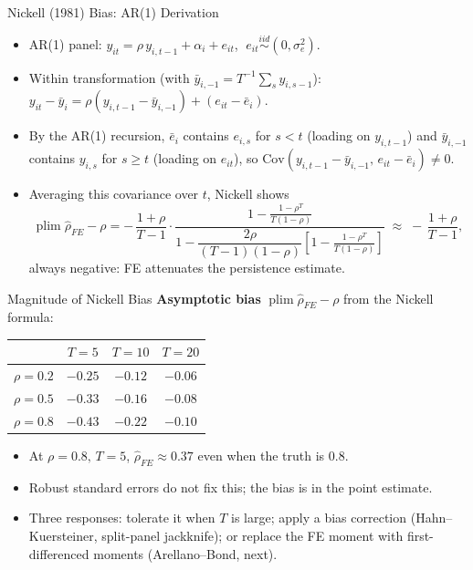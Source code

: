\documentclass[aspectratio=169, handout, t]{beamer}
\numberwithin{equation}{section}
\begin{document}
\begin{frame}{Nickell (1981) Bias: AR(1) Derivation}
\begin{itemize}
\item AR(1) panel: $y_{it}=\rho\,y_{i,t-1}+\alpha_i+e_{it}$, $\;e_{it}\stackrel{iid}{\sim}(0,\sigma_e^2)$.
\item Within transformation (with $\bar{y}_{i,-1}=T^{-1}\!\sum_s y_{i,s-1}$):
$y_{it}-\bar{y}_i = \rho(y_{i,t-1}-\bar{y}_{i,-1}) + (e_{it}-\bar{e}_i)$.\pause
\item By the AR(1) recursion, $\bar{e}_i$ contains $e_{i,s}$ for $s<t$ (loading on $y_{i,t-1}$) and $\bar{y}_{i,-1}$ contains $y_{i,s}$ for $s\geq t$ (loading on $e_{it}$), so $\text{Cov}(y_{i,t-1}-\bar{y}_{i,-1},\,e_{it}-\bar{e}_i)\neq 0$.\pause
\item Averaging this covariance over $t$, Nickell shows
\[
\operatorname{plim}\hat{\rho}_{FE}-\rho
=
-\,\frac{1+\rho}{T-1}\cdot
\frac{1-\frac{1-\rho^T}{T(1-\rho)}}{1-\dfrac{2\rho}{(T-1)(1-\rho)}\!\left[1-\frac{1-\rho^T}{T(1-\rho)}\right]}
\;\approx\; -\,\frac{1+\rho}{T-1},
\]
\alert{always negative}: FE attenuates the persistence estimate.
\end{itemize}
\end{frame}

\begin{frame}{Magnitude of Nickell Bias}
\textbf{Asymptotic bias} $\operatorname{plim}\hat{\rho}_{FE}-\rho$ from the Nickell formula:
\begin{center}
\renewcommand{\arraystretch}{1.05}
\begin{tabular}{@{}lccc@{}}
\toprule
            & $T=5$ & $T=10$ & $T=20$ \\
\midrule
$\rho=0.2$  & $-0.25$ & $-0.12$ & $-0.06$ \\
$\rho=0.5$  & $-0.33$ & $-0.16$ & $-0.08$ \\
$\rho=0.8$  & $-0.43$ & $-0.22$ & $-0.10$ \\
\bottomrule
\end{tabular}
\end{center}\pause
\begin{itemize}
\item At $\rho=0.8,\,T=5$, $\hat{\rho}_{FE}\approx 0.37$ even when the truth is $0.8$.
\item Robust standard errors do not fix this; the bias is in the point estimate.\pause
\item Three responses: tolerate it when $T$ is large; apply a bias correction (Hahn--Kuersteiner, split-panel jackknife); or replace the FE moment with first-differenced moments (Arellano--Bond, next).
\end{itemize}
\end{frame}
\end{document}
